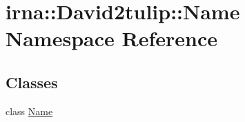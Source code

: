 \hypertarget{namespaceirna_1_1David2tulip_1_1Name}{
\section{irna\-:\-:\-David2tulip\-:\-:\-Name \-Namespace \-Reference}
\label{namespaceirna_1_1David2tulip_1_1Name}
}
\subsection*{\-Classes}
\begin{DoxyCompactItemize}
\item 
class \hyperlink{classirna_1_1David2tulip_1_1Name_1_1Name}{\-Name}
\end{DoxyCompactItemize}

